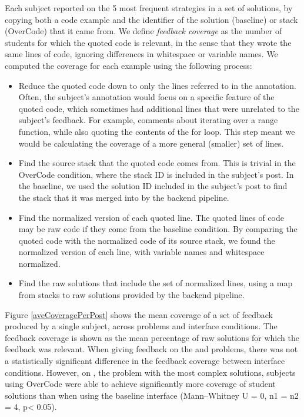 Each subject reported on the 5 most frequent strategies in a set of solutions, by copying both a code example and the identifier of the solution (baseline) or stack (OverCode) that it came from. We define \emph{feedback coverage} as the number of students for which the quoted code is relevant, in the sense that they wrote the same lines of code, ignoring differences in whitespace or variable names. We computed the coverage for each example using the following process:
\begin{itemize}
\item Reduce the quoted code down to only the lines referred to in the annotation. Often, the subject's annotation would focus on a specific feature of the quoted code, which sometimes had additional lines that were unrelated to the subject's feedback. For example, comments about iterating over a range function, while also quoting the contents of the for loop. This step meant we would be calculating the coverage of a more general (smaller) set of lines.

\item Find the source stack that the quoted code comes from. This is trivial in the OverCode condition, where the stack ID is included in the subject's post. In the baseline, we used the solution ID included in the subject's post to find the stack that it was merged into by the backend pipeline.

\item Find the normalized version of each quoted line. The quoted lines of code may be raw code if they come from the baseline condition. By comparing the quoted code with the normalized code of its source stack, we found the normalized version of each line, with variable names and whitespace normalized.

\item Find the raw solutions that include the set of normalized lines, using a map from stacks to raw solutions provided by the backend pipeline.
\end{itemize}

Figure \ref{aveCoveragePerPost} shows the mean coverage of a set of feedback produced by a single subject, across problems and interface conditions. The feedback coverage is shown as the mean percentage of raw solutions for which the feedback was relevant. When giving feedback on the  and  problems, there was not a statistically significant difference in the feedback coverage between interface conditions. However, on , the problem with the most complex solutions, subjects using OverCode were able to achieve significantly more coverage of student solutions than when using the baseline interface (Mann--Whitney U = 0, n1 = n2 = 4, p< 0.05).

